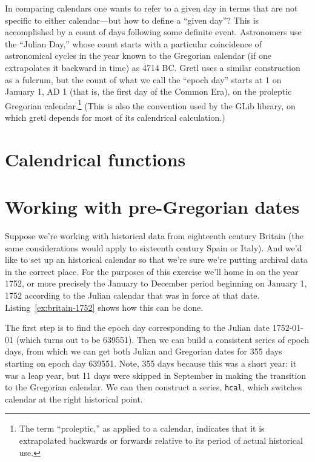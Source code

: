 In comparing calendars one wants to refer to a given day in terms that
are not specific to either calendar---but how to define a ``given
day''? This is accomplished by a count of days following some definite
event. Astronomers use the ``Julian Day,'' whose count starts with a
particular coincidence of astronomical cycles in the year known to the
Gregorian calendar (if one extrapolates it backward in time) as 4714
BC. Gretl uses a similar construction as a fulcrum, but the count of
what we call the ``epoch day'' starts at 1 on January 1, AD 1 (that
is, the first day of the Common Era), on the proleptic Gregorian
calendar.\footnote{The term ``proleptic,'' as applied to a calendar,
  indicates that it is extrapolated backwards or forwards relative to
  its period of actual historical use.} (This is also the convention
used by the \textsf{GLib} library, on which gretl depends for most of
its calendrical calculation.)

\section{Calendrical functions}
\label{cal-functions}

\section{Working with pre-Gregorian dates}
\label{cal-conversion}

Suppose we're working with historical data from eighteenth century
Britain (the same considerations would apply to sixteenth century
Spain or Italy). And we'd like to set up an historical calendar so
that we're sure we're putting archival data in the correct place.
For the purposes of this exercise we'll home in on the year 1752,
or more precisely the January to December period beginning on January
1, 1752 according to the Julian calendar that was in force at that
date. Listing~\ref{ex:britain-1752} shows how this can be done.

The first step is to find the epoch day corresponding to the Julian
date 1752-01-01 (which turns out to be 639551). Then we can build a
consistent series of epoch days, from which we can get both Julian and
Gregorian dates for 355 days starting on epoch day 639551. Note, 355
days because this was a short year: it was a leap year, but 11 days
were skipped in September in making the transition to the Gregorian
calendar. We can then construct a series, \texttt{hcal}, which
switches calendar at the right historical point.


